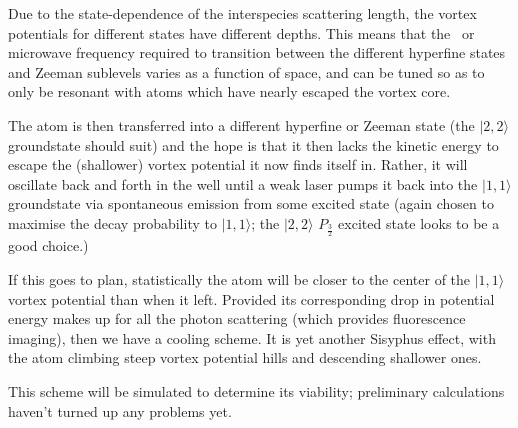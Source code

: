 Due to the state-dependence of the interspecies scattering length, the vortex potentials for different states have different depths. This means that the \rf\ or microwave frequency required to transition between the different hyperfine states and Zeeman sublevels varies as a function of space, and can be tuned so as to only be resonant with atoms which have nearly escaped the vortex core.

The atom is then transferred into a different hyperfine or Zeeman state (the $|2,2\rangle$ groundstate should suit) and the hope is that it then lacks the kinetic energy to escape the (shallower) vortex potential it now finds itself in. Rather, it will oscillate back and forth in the well until a weak laser pumps it back into the $|1,1\rangle$ groundstate via spontaneous emission from some excited state (again chosen to maximise the decay probability to $|1,1\rangle$; the $|2,2\rangle$ $P_\frac32$ excited state looks to be a good choice.)

If this goes to plan, statistically the atom will be closer to the center of the  $|1,1\rangle$ vortex potential than when it left. Provided its corresponding drop in potential energy makes up for all the photon scattering (which provides fluorescence imaging), then we have a cooling scheme. It is yet another Sisyphus effect, with the atom climbing steep vortex potential hills and descending shallower ones.

This scheme will be simulated to determine its viability; preliminary calculations haven't turned up any problems yet.


